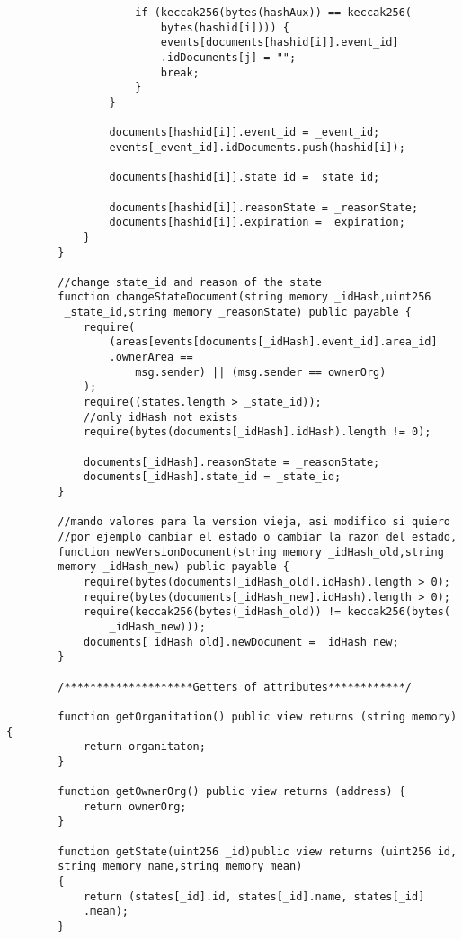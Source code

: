 \begin{verbatim}
                    if (keccak256(bytes(hashAux)) == keccak256(
                        bytes(hashid[i]))) {
                        events[documents[hashid[i]].event_id]
                        .idDocuments[j] = "";
                        break;
                    }
                }
    
                documents[hashid[i]].event_id = _event_id;
                events[_event_id].idDocuments.push(hashid[i]);
    
                documents[hashid[i]].state_id = _state_id;
    
                documents[hashid[i]].reasonState = _reasonState;
                documents[hashid[i]].expiration = _expiration;
            }
        }
    
        //change state_id and reason of the state
        function changeStateDocument(string memory _idHash,uint256
         _state_id,string memory _reasonState) public payable {
            require(
                (areas[events[documents[_idHash].event_id].area_id]
                .ownerArea ==
                    msg.sender) || (msg.sender == ownerOrg)
            );
            require((states.length > _state_id));
            //only idHash not exists
            require(bytes(documents[_idHash].idHash).length != 0);
    
            documents[_idHash].reasonState = _reasonState;
            documents[_idHash].state_id = _state_id;
        }
    
        //mando valores para la version vieja, asi modifico si quiero
        //por ejemplo cambiar el estado o cambiar la razon del estado,
        function newVersionDocument(string memory _idHash_old,string 
        memory _idHash_new) public payable {
            require(bytes(documents[_idHash_old].idHash).length > 0);
            require(bytes(documents[_idHash_new].idHash).length > 0);
            require(keccak256(bytes(_idHash_old)) != keccak256(bytes(
                _idHash_new)));
            documents[_idHash_old].newDocument = _idHash_new;
        }
    
        /********************Getters of attributes************/
    
        function getOrganitation() public view returns (string memory) {
            return organitaton;
        }
    
        function getOwnerOrg() public view returns (address) {
            return ownerOrg;
        }
    
        function getState(uint256 _id)public view returns (uint256 id,
        string memory name,string memory mean)
        {
            return (states[_id].id, states[_id].name, states[_id]
            .mean);
        }
    

\end{verbatim}

